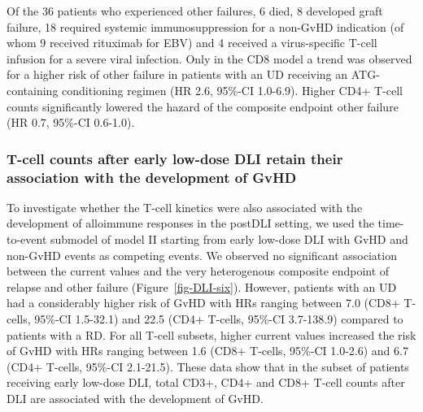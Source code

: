 \documentclass[
  letterpaper,
  paper=240mm:170mm,
  twoside=true,
  open=right,
  fontsize=10pt,
  pagesize=false,
  BCOR=15mm,
  DIV=14,
  headinclude=true,
  footinclude=false,
  headsepline=on]{scrbook}
\begin{document}
Of the 36 patients who experienced other failures, 6 died, 8 developed
graft failure, 18 required systemic immunosuppression for a non-GvHD
indication (of whom 9 received rituximab for EBV) and 4 received a
virus-specific T-cell infusion for a severe viral infection. Only in the
CD8 model a trend was observed for a higher risk of other failure in
patients with an UD receiving an ATG-containing conditioning regimen (HR
2.6, 95\%-CI 1.0-6.9). Higher CD4+ T-cell counts significantly lowered
the hazard of the composite endpoint other failure (HR 0.7, 95\%-CI
0.6-1.0).

\subsubsection{T-cell counts after early low-dose DLI retain their
association with the development of
GvHD}\label{t-cell-counts-after-early-low-dose-dli-retain-their-association-with-the-development-of-gvhd}

To investigate whether the T-cell kinetics were also associated with the
development of alloimmune responses in the postDLI setting, we used the
time-to-event submodel of model II starting from early low-dose DLI with
GvHD and non-GvHD events as competing events. We observed no significant
association between the current values and the very heterogenous
composite endpoint of relapse and other failure
(Figure~\ref{fig-DLI-six}). However, patients with an UD had a
considerably higher risk of GvHD with HRs ranging between 7.0 (CD8+
T-cells, 95\%-CI 1.5-32.1) and 22.5 (CD4+ T-cells, 95\%-CI 3.7-138.9)
compared to patients with a RD. For all T-cell subsets, higher current
values increased the risk of GvHD with HRs ranging between 1.6 (CD8+
T-cells, 95\%-CI 1.0-2.6) and 6.7 (CD4+ T-cells, 95\%-CI 2.1-21.5).
These data show that in the subset of patients receiving early low-dose
DLI, total CD3+, CD4+ and CD8+ T-cell counts after DLI are associated
with the development of GvHD.
\end{document}
